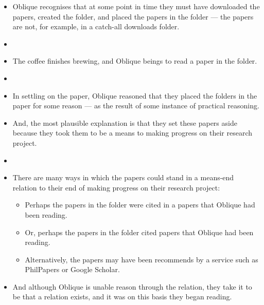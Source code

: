 \documentclass[10pt]{article}
\begin{document}
\begin{itemize}[noitemsep]
\item Oblique recognises that at some point in time they must have downloaded the papers, created the folder, and placed the papers in the folder --- the papers are not, for example, in a catch-all downloads folder.
\item[]
\item The coffee finishes brewing, and Oblique beings to read a paper in the folder.
\item[]
\item In settling on the paper, Oblique reasoned that they placed the folders in the paper for some reason --- as the result of some instance of practical reasoning.
\item And, the most plausible explanation is that they set these papers aside because they took them to be a means to making progress on their research project.
\item[]
\item There are many ways in which the papers could stand in a means-end relation to their end of making progress on their research project:
  \begin{itemize}
  \item Perhaps the papers in the folder were cited in a papers that Oblique had been reading.
  \item Or, perhaps the papers in the folder cited papers that Oblique had been reading.
  \item Alternatively, the papers may have been recommends by a service such as PhilPapers or Google Scholar.
  \end{itemize}
\item And although Oblique is unable reason through the relation, they take it to be that a relation exists, and it was on this basis they began reading.
\end{itemize}
\end{document}
